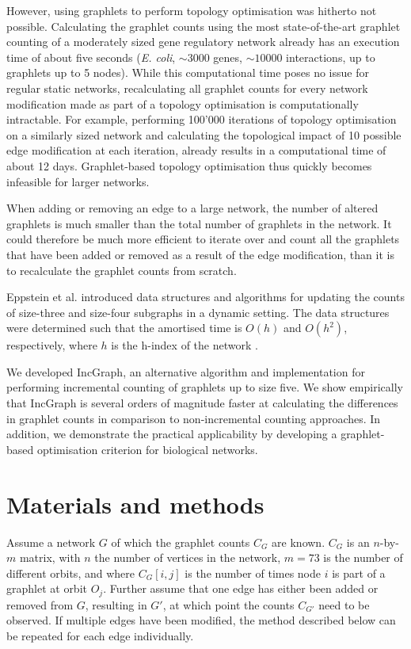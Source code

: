 However, using graphlets to perform topology optimisation was hitherto not possible. Calculating the graphlet counts using the most state-of-the-art graphlet counting of a moderately sized gene regulatory network already has an execution time of about five seconds (\textit{E. coli}, $\sim 3000$ genes, $\sim 10000$ interactions, up to graphlets up to 5 nodes).
While this computational time poses no issue for regular static networks, recalculating all graphlet counts for every network modification made as part of a topology optimisation is computationally intractable. For example, performing 100'000 iterations of topology optimisation on a similarly sized network and calculating the topological impact of 10 possible edge modification at each iteration, already results in a computational time of about 12 days. Graphlet-based topology optimisation thus quickly becomes infeasible for larger networks.

When adding or removing an edge to a large network, the number of altered graphlets is much smaller than the total number of graphlets in the network. It could therefore be much more efficient to iterate over and count all the graphlets that have been added or removed as a result of the edge modification, than it is to recalculate the graphlet counts from scratch. 

Eppstein et al. introduced data structures and algorithms for updating the counts of size-three \cite{eppstein_hindexgraphits_2009} and size-four \cite{eppstein_extendeddynamicsubgraph_2012} subgraphs in a dynamic setting. The data structures were determined such that the amortised time is $O(h)$ and $O(h^2)$, respectively, where $h$ is the h-index of the network \cite{hirsch_indexquantifyindividual_2005}.

We developed IncGraph, an alternative algorithm and implementation for performing incremental counting of graphlets up to size five. We show empirically that IncGraph is several orders of magnitude faster at calculating the differences in graphlet counts in comparison to non-incremental counting approaches. In addition, we demonstrate the practical applicability by developing a graphlet-based optimisation criterion for biological networks.


\section*{Materials and methods}
Assume a network $G$ of which the graphlet counts $C_G$ are known. $C_G$ is an $n$-by-$m$ matrix, with $n$ the number of vertices in the network, $m = 73$ is the number of different orbits, and where $C_G[i,j]$ is the number of times node $i$ is part of a graphlet at orbit $O_j$. 
Further assume that one edge has either been added or removed from $G$, resulting in $G'$, at which point the counts $C_{G'}$ need to be observed. If multiple edges have been modified, the method described below can be repeated for each edge individually.

